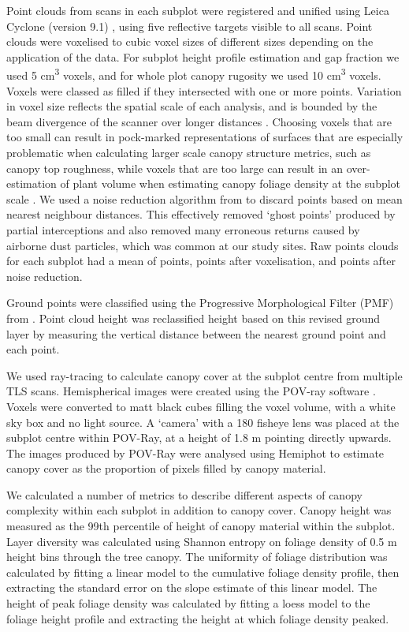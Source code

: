 \documentclass[11pt,a4paper]{article}
\newcommand{\textapprox}{\raisebox{0.5ex}{\texttildelow}}  %
\begin{document}
Point clouds from scans in each subplot were registered and unified using Leica Cyclone (version 9.1) \citep{Cyclone}, using five reflective targets visible to all scans. Point clouds were voxelised to cubic voxel sizes of different sizes depending on the application of the data. For subplot height profile estimation and gap fraction we used 5 cm\textsuperscript{3} voxels, and for whole plot canopy rugosity we used 10 cm\textsuperscript{3} voxels. Voxels were classed as filled if they intersected with one or more points. Variation in voxel size reflects the spatial scale of each analysis, and is bounded by the beam divergence of the scanner over longer distances \citep{}. Choosing voxels that are too small can result in pock-marked representations of surfaces that are especially problematic when calculating larger scale canopy structure metrics, such as canopy top roughness, while voxels that are too large can result in an over-estimation of plant volume when estimating canopy foliage density at the subplot scale \citep{Seidel2012, Cifuentes2014}. We used a noise reduction algorithm from \citet{} to discard points based on mean nearest neighbour distances. This effectively removed `ghost points' produced by partial interceptions and also removed many erroneous returns caused by airborne dust particles, which was common at our study sites. Raw points clouds for each subplot had a mean of \textapprox{}\rawpt{} points, \textapprox{}\voxelpt{} points after voxelisation, and \textapprox{}\subpt{} points after noise reduction.

Ground points were classified using the Progressive Morphological Filter (PMF) from \citet{Zhang2003}. Point cloud height was reclassified height based on this revised ground layer by measuring the vertical distance between the nearest ground point and each point.

We used ray-tracing to calculate canopy cover at the subplot centre from multiple TLS scans. Hemispherical images were created using the POV-ray software \citep{}. Voxels were converted to matt black cubes filling the voxel volume, with a white sky box and no light source. A `camera' with a 180\textdegree{} fisheye lens was placed at the subplot centre within POV-Ray, at a height of 1.8 m pointing directly upwards. The images produced by POV-Ray were analysed using Hemiphot \citep{Steege} to estimate canopy cover as the proportion of pixels filled by canopy material.

We calculated a number of metrics to describe different aspects of canopy complexity within each subplot in addition to canopy cover. Canopy height was measured as the 99th percentile of height of canopy material within the subplot. Layer diversity was calculated using Shannon entropy on foliage density of 0.5 m height bins through the tree canopy. The uniformity of foliage distribution was calculated by fitting a linear model to the cumulative foliage density profile, then extracting the standard error on the slope estimate of this linear model. The height of peak foliage density was calculated by fitting a loess model to the foliage height profile and extracting the height at which foliage density peaked.  
\end{document}
